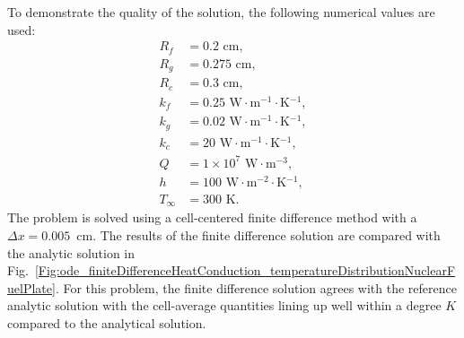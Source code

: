 To demonstrate the quality of the solution, the following numerical values are used:
\begin{align}
  R_f &= 0.2 \text{ cm}, \nonumber \\
  R_g &= 0.275 \text{ cm}, \nonumber \\
  R_c &= 0.3 \text{ cm}, \nonumber \\
  k_f &= 0.25 \text{ W$\cdot$m$^{-1}\cdot$K$^{-1}$}, \nonumber \\
  k_g &= 0.02 \text{ W$\cdot$m$^{-1}\cdot$K$^{-1}$}, \nonumber \\ 
  k_c &= 20 \text{ W$\cdot$m$^{-1}\cdot$K$^{-1}$}, \nonumber \\
  Q   &= 1 \times 10^7 \text{ W$\cdot$m$^{-3}$}, \nonumber \\
  h   &= 100 \text{ W$\cdot$m$^{-2}\cdot$K$^{-1}$}, \nonumber \\
  T_\infty &= 300 \text{ K}. \nonumber
\end{align}
The problem is solved using a cell-centered finite difference method with a $\Delta x = 0.005$~cm. The results of the finite difference solution are compared with the analytic solution in Fig.~\ref{Fig:ode_finiteDifferenceHeatConduction_temperatureDistributionNuclearFuelPlate}. For this problem, the finite difference solution agrees with the reference analytic solution with the cell-average quantities lining up well within a degree $K$ compared to the analytical solution.
